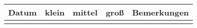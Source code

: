 \documentclass[a4paper]{article}
\begin{document}
\pagestyle{empty}
\centering
\begin{tabular}{p{2cm}||p{2cm}|p{2cm}|p{2cm}||p{8cm}}
  Datum & klein & mittel & groß & Bemerkungen \\
  \midrule
        &       &        &      &             \\[24cm]
\end{tabular}
\end{document}
